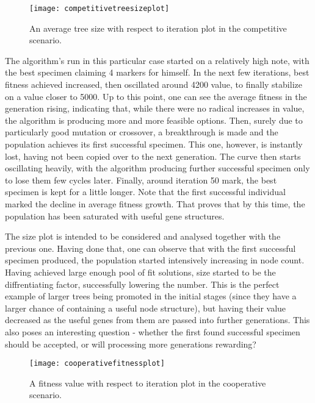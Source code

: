 \begin{figure}[h]
    \centering
    \texttt{[image: competitivetreesizeplot]}
    \caption{An average tree size with respect to iteration plot in the competitive scenario.}
    \label{fig:x competitivetreesizeplot}
\end{figure}
The algorithm's run in this particular case started on a relatively high note, with the best specimen claiming 4 markers for himself. In the next few iterations, best fitness achieved increased, then oscillated around 4200 value, to finally stabilize on a value closer to 5000. Up to this point, one can see the average fitness in the generation rising, indicating that, while there were no radical increases in value, the algorithm is producing more and more feasible options. Then, surely due to particularly good mutation or crossover, a breakthrough is made and the population achieves its first successful specimen. This one, however, is instantly lost, having not been copied over to the next generation. The curve then starts oscillating heavily, with the algorithm producing further successful specimen only to lose them few cycles later. Finally, around iteration 50 mark, the best specimen is kept for a little longer. Note that the first successful individual marked the decline in average fitness growth. That proves that by this time, the population has been saturated with useful gene structures.

The size plot is intended to be considered and analysed together with the previous one. Having done that, one can observe that with the first successful specimen produced, the population started intensively increasing in node count. Having achieved large enough pool of fit solutions, size started to be the diffrentiating factor, successfully lowering the number. This is the perfect example of larger trees being promoted in the initial stages (since they have a larger chance of containing a useful node structure), but having their value decreased as the useful genes from them are passed into further generations. This also poses an interesting question - whether the first found successful specimen should be accepted, or will processing more generations rewarding?

\begin{figure}[h]
    \centering
    \texttt{[image: cooperativefitnessplot]}
    \caption{A fitness value with respect to iteration plot in the cooperative scenario.}
    \label{fig:x cooperativefitnessplot}
\end{figure}

